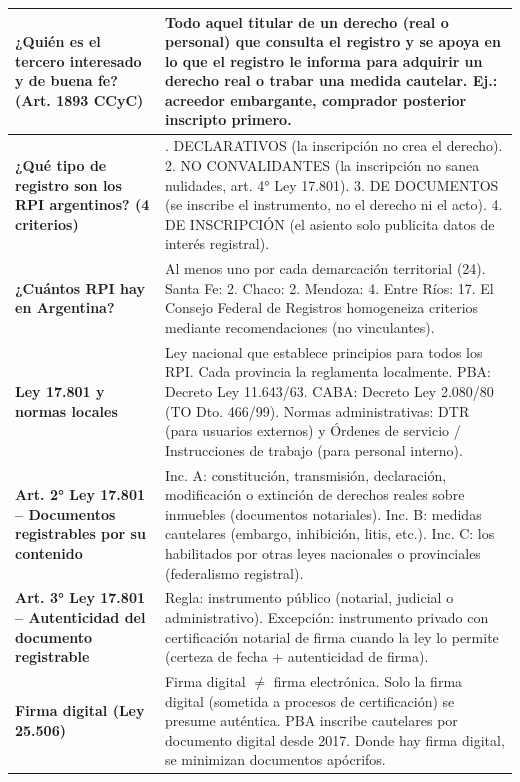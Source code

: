 \documentclass[11pt]{article}
\begin{document}
\begin{longtable}{|>{\raggedright\arraybackslash}p{}|>{\raggedright\arraybackslash}p{}|}
\rowcolor{graybox}
\textbf{¿Quién es el tercero interesado y de buena fe? (Art. 1893 CCyC)} &
Todo aquel titular de un derecho (real o personal) que consulta el registro y se apoya en lo que el registro le informa para adquirir un derecho real o trabar una medida cautelar. Ej.: acreedor embargante, comprador posterior inscripto primero.\\ \hline
\rowcolor{lightblue}
\textbf{¿Qué tipo de registro son los RPI argentinos? (4 criterios)} &
1. DECLARATIVOS (la inscripción no crea el derecho). 2. NO CONVALIDANTES (la inscripción no sanea nulidades, art. 4° Ley 17.801). 3. DE DOCUMENTOS (se inscribe el instrumento, no el derecho ni el acto). 4. DE INSCRIPCIÓN (el asiento solo publicita datos de interés registral).\\ \hline
\rowcolor{graybox}
\textbf{¿Cuántos RPI hay en Argentina?} &
Al menos uno por cada demarcación territorial (24). Santa Fe: 2. Chaco: 2. Mendoza: 4. Entre Ríos: 17. El Consejo Federal de Registros homogeneiza criterios mediante recomendaciones (no vinculantes).\\ \hline
\rowcolor{lightblue}
\textbf{Ley 17.801 y normas locales} &
Ley nacional que establece principios para todos los RPI. Cada provincia la reglamenta localmente. PBA: Decreto Ley 11.643/63. CABA: Decreto Ley 2.080/80 (TO Dto. 466/99). Normas administrativas: DTR (para usuarios externos) y Órdenes de servicio / Instrucciones de trabajo (para personal interno).\\ \hline
\rowcolor{graybox}
\textbf{Art. 2° Ley 17.801 -- Documentos registrables por su contenido} &
Inc. A: constitución, transmisión, declaración, modificación o extinción de derechos reales sobre inmuebles (documentos notariales). Inc. B: medidas cautelares (embargo, inhibición, litis, etc.). Inc. C: los habilitados por otras leyes nacionales o provinciales (federalismo registral).\\ \hline
\rowcolor{lightblue}
\textbf{Art. 3° Ley 17.801 -- Autenticidad del documento registrable} &
Regla: instrumento público (notarial, judicial o administrativo). Excepción: instrumento privado con certificación notarial de firma cuando la ley lo permite (certeza de fecha + autenticidad de firma).\\ \hline
\rowcolor{graybox}
\textbf{Firma digital (Ley 25.506)} &
Firma digital $\neq$ firma electrónica. Solo la firma digital (sometida a procesos de certificación) se presume auténtica. PBA inscribe cautelares por documento digital desde 2017. Donde hay firma digital, se minimizan documentos apócrifos.\\ \hline
\end{longtable}
\end{document}
